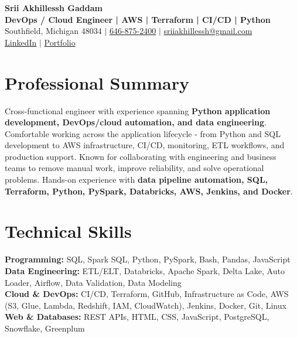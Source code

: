 \documentclass[letterpaper,10pt]{article}
\begin{document}
\fontsize{9.35pt}{10.45pt}\selectfont

\begin{center}
    {\LARGE \textbf{Srii Akhillessh Gaddam}} \\[-1pt]
    \textbf{DevOps / Cloud Engineer | AWS | Terraform | CI/CD | Python} \\[2pt]
    Southfield, Michigan 48034 $|$
    \href{tel:6468752400}{646-875-2400} $|$
    \href{mailto:sriiakhillessh@gmail.com}{sriiakhillessh@gmail.com} \\[1pt]
    \href{https://www.linkedin.com/in/srii-akhiilessh-gaddam-b48668191/}{LinkedIn} $|$
    \href{https://sriiakhillesshg.github.io/portfolio/}{Portfolio}
\end{center}
\vspace{-8pt}

\section{Professional Summary}
\small{Cross-functional engineer with experience spanning \textbf{Python application development, DevOps/cloud automation, and data engineering}. Comfortable working across the application lifecycle - from Python and SQL development to AWS infrastructure, CI/CD, monitoring, ETL workflows, and production support. Known for collaborating with engineering and business teams to remove manual work, improve reliability, and solve operational problems. Hands-on experience with \textbf{data pipeline automation, SQL, Terraform, Python, PySpark, Databricks, AWS, Jenkins, and Docker}.}

\section{Technical Skills}
\small{
\textbf{Programming:} SQL, Spark SQL, Python, PySpark, Bash, Pandas, JavaScript \\
\textbf{Data Engineering:} ETL/ELT, Databricks, Apache Spark, Delta Lake, Auto Loader, Airflow, Data Validation, Data Modeling \\
\textbf{Cloud \& DevOps:} CI/CD, Terraform, GitHub, Infrastructure as Code, AWS (S3, Glue, Lambda, Redshift, IAM, CloudWatch), Jenkins, Docker, Git, Linux \\
\textbf{Web \& Databases:} REST APIs, HTML, CSS, JavaScript, PostgreSQL, Snowflake, Greenplum
}
\end{document}
